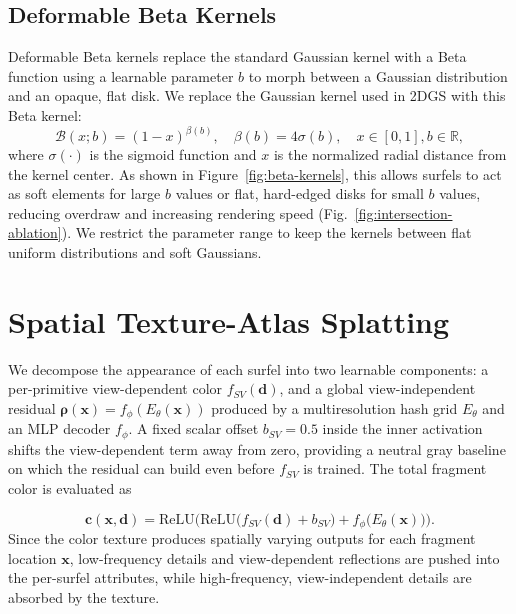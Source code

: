 \documentclass[acmtog,anonymous,review]{acmart}
\begin{document}
\subsection{Deformable Beta Kernels} \label{sec:beta-kernels}

Deformable Beta kernels \cite{liu2025deformable} replace the standard Gaussian
kernel with a Beta function using a learnable parameter $b$ to morph
between a Gaussian distribution and an opaque, flat disk. We replace the
Gaussian kernel used in 2DGS with this Beta kernel: 
\begin{equation}
\mathcal{B}(x;b) = (1-x)^{\beta(b)},\quad \beta(b)=4\sigma(b),\quad x \in [0,1],
b \in \mathbb{R}, \label{eq:beta-kernel} 
\end{equation} 
where $\sigma(\cdot)$ is
the sigmoid function and $x$ is the normalized radial distance from the kernel
center. As shown in Figure~\ref{fig:beta-kernels}, this allows surfels to act as
soft elements for large $b$ values or flat, hard-edged disks for small $b$ values, reducing overdraw and increasing rendering speed
(Fig.~\ref{fig:intersection-ablation}).
We restrict the parameter range to keep the kernels between flat uniform
distributions and soft Gaussians.


\section{Spatial Texture-Atlas Splatting}
We decompose the appearance of each surfel into two learnable
components: a per-primitive view-dependent color $f_{SV}(\mathbf{d})$,
and a global view-independent residual
$\boldsymbol{\rho}(\mathbf{x}) = f_\phi(E_\theta(\mathbf{x}))$ produced
by a multiresolution hash grid $E_\theta$ and an MLP decoder $f_\phi$.
A fixed scalar offset $b_{SV} = 0.5$ inside the inner activation shifts the view-dependent term away from zero, providing a neutral gray baseline on which the residual can build even before $f_{SV}$ is trained.
The total fragment color is evaluated as

\begin{equation}
\mathbf{c}(\mathbf{x}, \mathbf{d}) = \mathrm{ReLU}\Big(
    \mathrm{ReLU}\big( f_{SV}(\mathbf{d}) + b_{SV} \big)
    + f_\phi\!\big(E_\theta(\mathbf{x})\big)
\Big).
\label{eq:color}
\end{equation}
Since the color texture produces spatially varying outputs for each fragment location $\mathbf{x}$, low-frequency details and view-dependent reflections are pushed into the per-surfel attributes, while high-frequency, view-independent details are absorbed by the texture. 
\end{document}
